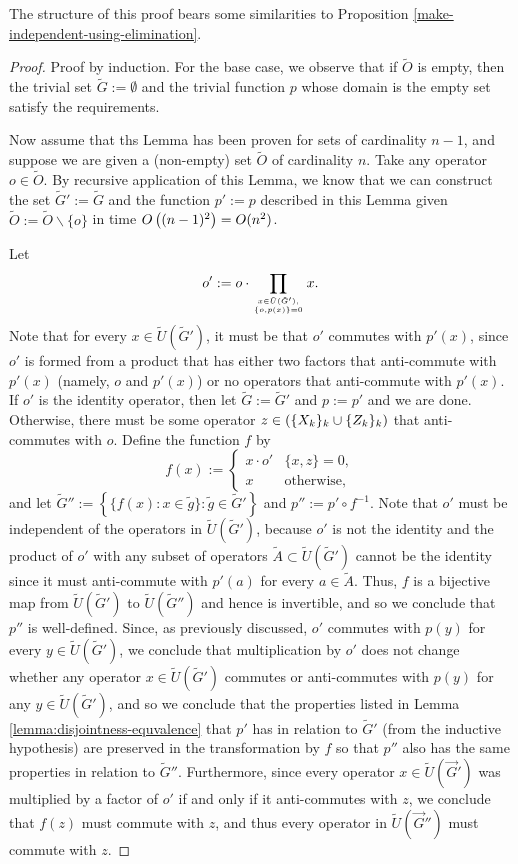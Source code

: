 \documentclass[twocolumn,showpacs,preprintnumbers,amsmath,amssymb,nofootinbib,pra,floatfix]{revtex4-1}
\newenvironment{remark}[1][Remark]{\begin{trivlist}
\item[\hskip \labelsep {\bfseries #1}]}{\end{trivlist}}
\newcommand{\lst}{\vec}
\newcommand{\set}{\tilde}
\begin{document}
\begin{remark}
The structure of this proof bears some similarities to Proposition \ref{make-independent-using-elimination}.
\end{remark}

\begin{proof}
Proof by induction.  For the base case, we observe that if $\set O$ is empty, then the trivial set $\set G:=\emptyset$ and the trivial function $p$ whose domain is the empty set satisfy the requirements.

Now assume that ths Lemma has been proven for sets of cardinality $n-1$, and suppose we are given a (non-empty) set $\set O$ of cardinality $n$.  Take any operator $o\in\set O$.  By recursive application of this Lemma, we know that we can construct the set $\set G':=\set G$ and the function $p':=p$ described in this Lemma given $\set O:=\set O\backslash\{o\}$ in time $O\left((n-1)^2\right)=O(n^2)$.

Let $$o':=o\cdot \prod_{x\in\set U(\set G'),\atop\{o,p(x)\}=0} x.$$  Note that for every $x\in\set U(\set G')$, it must be that $o'$ commutes with $p'(x)$, since $o'$ is formed from a product that has either two factors that anti-commute with $p'(x)$ (namely, $o$ and $p'(x)$) or no operators that anti-commute with $p'(x)$.  If $o'$ is the identity operator, then let $\set G:=\set G'$ and $p:=p'$ and we are done.  Otherwise, there must be some operator $z\in\left(\{X_k\}_k \cup \{Z_k\}_k\right)$ that anti-commutes with $o$.  Define the function $f$ by
$$f(x) :=
\begin{cases}
x \cdot o' & \{x,z\}=0, \\
x          & \text{otherwise},
\end{cases}
$$
and let $\set G'':=\left\{\{f(x):x\in\set g\}:\set g\in\set G'\right\}$ and $p'':=p'\circ f^{-1}$.  Note that $o'$ must be independent of the operators in $\set U(\set G')$, because $o'$ is not the identity and the product of $o'$ with any subset of operators $\set A\subset\set U(\set G')$ cannot be the identity since it must anti-commute with $p'(a)$ for every $a\in\set A$.  Thus, $f$ is a bijective map from $\set U(\set G')$ to $\set U(\set G'')$ and hence is invertible, and so we conclude that $p''$ is well-defined.  Since, as previously discussed, $o'$ commutes with $p(y)$ for every $y\in\set U(\set G')$, we conclude that multiplication by $o'$ does not change whether any operator $x\in\set U(\set G')$ commutes or anti-commutes with $p(y)$ for any $y\in\set U(\set G')$, and so we conclude that the properties listed in Lemma \ref{lemma:disjointness-equvalence} that $p'$ has in relation to $\set G'$ (from the inductive hypothesis) are preserved in the transformation by $f$ so that $p''$ also has the same properties in relation to $\set G''$.  Furthermore, since every operator $x\in\set U(\lst G')$ was multiplied by a factor of $o'$ if and only if it anti-commutes with $z$, we conclude that $f(z)$ must commute with $z$, and thus every operator in $\set U(\lst G'')$ must commute with $z$.


\end{proof}
\end{document}
